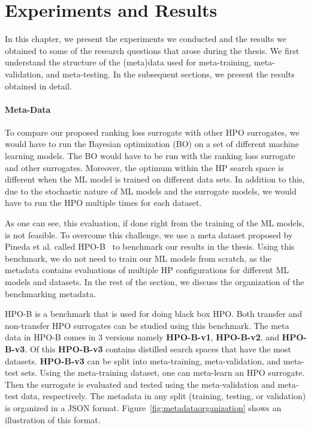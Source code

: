 \documentclass[12pt, twoside, ngerman]{report}
\begin{document}
\chapter{Experiments and Results}

In this chapter, we present the experiments we conducted and the results we obtained to some of the research questions that arose during the thesis.
We first understand the structure of the (meta)data used for meta-training,  meta-validation,  and meta-testing.
In the subsequent sections, we present the results obtained in detail.

\subsubsection{Meta-Data}

To compare our proposed ranking loss surrogate with other HPO surrogates, we would have to run the Bayesian optimization (BO) on a set of different machine learning models.
The BO would have to be run with the ranking loss surrogate and other surrogates.
Moreover, the optimum within the HP search space is different when the ML model is trained on different data sets.
In addition to this, due to the stochastic nature of ML models and the surrogate models, we would have to run the HPO multiple times for each dataset.

As one can see,  this evaluation, if done right from the training of the ML models, is not feasible.
To overcome this challenge, we use a meta dataset proposed by Pineda
 et al. called HPO-B~\cite{DBLP:journals/corr/abs-2106-06257} to benchmark our results in the thesis.
Using this benchmark, we do not need to train our ML models from scratch, as the metadata contains evaluations of multiple HP configurations for different ML models and datasets.
In the rest of the section, we discuss the organization of the benchmarking metadata.

HPO-B is a benchmark that is used for doing black box HPO.
Both transfer and non-transfer HPO surrogates can be studied using this benchmark.
The meta data in HPO-B comes in 3 versions namely \textbf{HPO-B-v1},  \textbf{HPO-B-v2}, and \textbf{HPO-B-v3}.
Of this \textbf{HPO-B-v3} contains distilled search spaces that have the most datasets. \textbf{HPO-B-v3} can be split into meta-training, meta-validation, and meta-test sets. 
Using the meta-training dataset, one can meta-learn an HPO surrogate.
Then the surrogate is evaluated and tested using the meta-validation and meta-test data, respectively.
The metadata in any split (training, testing, or validation) is organized in a JSON format. Figure~\ref{fig:metadataorganization} shows an illustration of this format.
\end{document}
